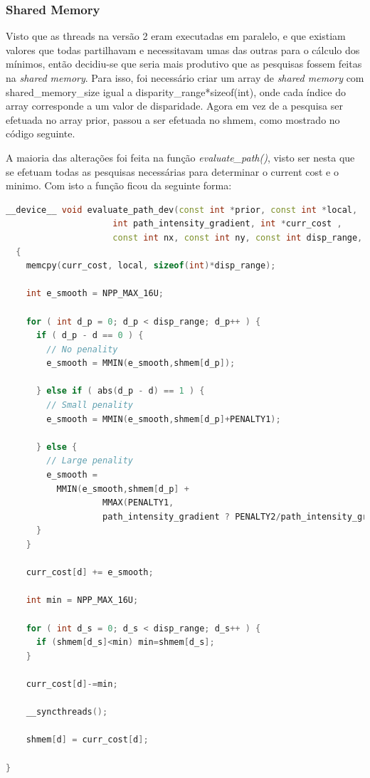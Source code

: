 \documentclass[pdftex,12pt,a4paper]{report}
\begin{document}
\newpage
\subsubsection{Shared Memory}

Visto que as threads na versão 2 eram executadas em paralelo, e que existiam valores que todas partilhavam e necessitavam umas das outras para o cálculo dos mínimos, então decidiu-se que seria mais produtivo que as pesquisas fossem feitas na \textit{shared memory}. Para isso, foi necessário criar um array de \textit{shared memory} com shared\_memory\_size igual a disparity\_range*sizeof(int), onde cada índice do array corresponde a um valor de disparidade. Agora em vez de a pesquisa ser efetuada no array prior, passou a ser efetuada no shmem, como mostrado no código seguinte.

A maioria das alterações foi feita na função \textit{evaluate\_path()}, visto ser nesta que se efetuam todas as pesquisas necessárias para determinar o current cost e o minimo. Com isto a função ficou da seguinte forma:

  \begin{lstlisting}[language=c++, basicstyle=\scriptsize]
__device__ void evaluate_path_dev(const int *prior, const int *local,
                     int path_intensity_gradient, int *curr_cost ,
                     const int nx, const int ny, const int disp_range, const int d, int shmem[])
  {
    memcpy(curr_cost, local, sizeof(int)*disp_range);
    
    int e_smooth = NPP_MAX_16U;

    for ( int d_p = 0; d_p < disp_range; d_p++ ) {
      if ( d_p - d == 0 ) {
        // No penality
        e_smooth = MMIN(e_smooth,shmem[d_p]);
        
      } else if ( abs(d_p - d) == 1 ) {
        // Small penality
        e_smooth = MMIN(e_smooth,shmem[d_p]+PENALTY1);
        
      } else {
        // Large penality
        e_smooth =
          MMIN(e_smooth,shmem[d_p] +
                   MMAX(PENALTY1,
                   path_intensity_gradient ? PENALTY2/path_intensity_gradient : PENALTY2));
      }
    }

    curr_cost[d] += e_smooth;

    int min = NPP_MAX_16U;
    
    for ( int d_s = 0; d_s < disp_range; d_s++ ) {
      if (shmem[d_s]<min) min=shmem[d_s];
    }
    
    curr_cost[d]-=min;
    
    __syncthreads();
    
    shmem[d] = curr_cost[d];

}

\end{lstlisting} 
\end{document}
